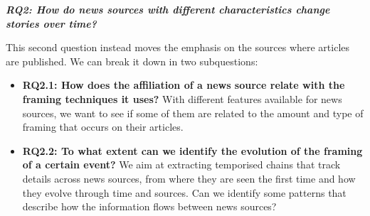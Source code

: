 \vspace{12px}

\textit{\textbf{RQ2: How do news sources with different characteristics change stories over time?}}

\vspace{12px}

This second question instead moves the emphasis on the sources where articles are published. We can break it down in two subquestions:

\begin{itemize}
    \item \textbf{RQ2.1: How does the affiliation of a news source relate with the  framing techniques it uses?}
    With different features available for news sources, we want to see if some of them are related to the amount and type of framing that occurs on their articles.
    
    \item \textbf{RQ2.2: To what extent can we identify the evolution of the framing of a certain event?}
    We aim at extracting temporised chains that track details across news sources, from where they are seen the first time and how they evolve through time and sources.
    Can we identify some patterns that describe how the information flows between news sources?
    
    
    
\end{itemize}
